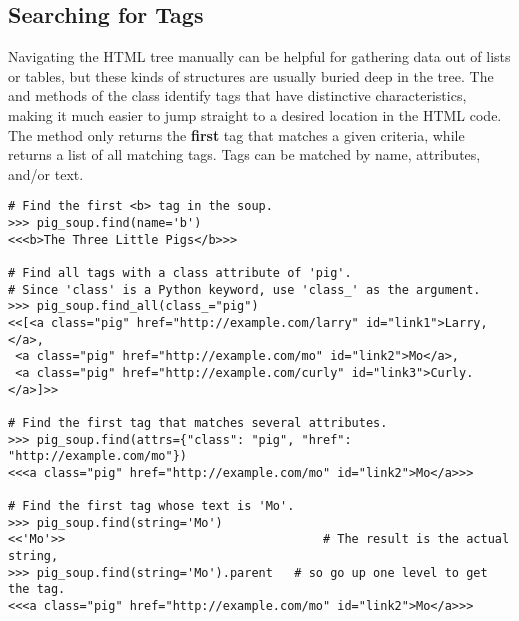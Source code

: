 \begin{comment}
\begin{problem} %

Write a function that returns the following line using three different methods.
\begin{lstlisting}
<<'More information...'>>
\end{lstlisting}
The function should accept an integer.
If the integer is 1, find the line using tag names and the \li{.string} method.
If the integer is 2, find the line by traversing through the children of the body tag with repeated calls to \li{.contents}.
If the integer is 3, find the line by using navigation between siblings and \li{.string}.
\end{problem}
\end{comment}

\subsection*{Searching for Tags} %

Navigating the HTML tree manually can be helpful for gathering data out of lists or tables, but these kinds of structures are usually buried deep in the tree.
The  and  methods of the  class identify tags that have distinctive characteristics, making it much easier to jump straight to a desired location in the HTML code.
The  method only returns the \textbf{first} tag that matches a given criteria, while  returns a list of all matching tags.
Tags can be matched by name, attributes, and/or text.

\begin{lstlisting}
# Find the first <b> tag in the soup.
>>> pig_soup.find(name='b')
<<<b>The Three Little Pigs</b>>>

# Find all tags with a class attribute of 'pig'.
# Since 'class' is a Python keyword, use 'class_' as the argument.
>>> pig_soup.find_all(class_="pig")
<<[<a class="pig" href="http://example.com/larry" id="link1">Larry,</a>,
 <a class="pig" href="http://example.com/mo" id="link2">Mo</a>,
 <a class="pig" href="http://example.com/curly" id="link3">Curly.</a>]>>

# Find the first tag that matches several attributes.
>>> pig_soup.find(attrs={"class": "pig", "href": "http://example.com/mo"})
<<<a class="pig" href="http://example.com/mo" id="link2">Mo</a>>>

# Find the first tag whose text is 'Mo'.
>>> pig_soup.find(string='Mo')
<<'Mo'>>                                    # The result is the actual string,
>>> pig_soup.find(string='Mo').parent   # so go up one level to get the tag.
<<<a class="pig" href="http://example.com/mo" id="link2">Mo</a>>>
\end{lstlisting}


